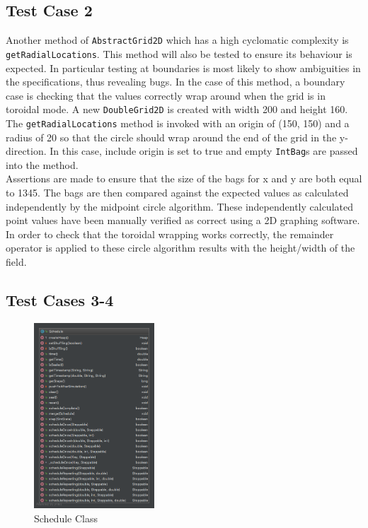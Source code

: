 \documentclass[11pt]{article}
\begin{document}
\subsection{Test Case 2}
Another method of \texttt{AbstractGrid2D} which has a high cyclomatic complexity is \texttt{getRadialLocations}.
This method will also be tested to ensure its behaviour is expected.
In particular testing at boundaries is most likely to show ambiguities in the specifications\cite[pp.25]{lessons_book}, thus revealing bugs.
In the case of this method, a boundary case is checking that the values correctly wrap around when the grid is in toroidal mode.
A new \texttt{DoubleGrid2D} is created with width 200 and height 160.
The \texttt{getRadialLocations} method is invoked with an origin of (150, 150) and a radius of 20 so that the circle should wrap around the end of the grid in the y-direction.
In this case, include origin is set to true and empty \texttt{IntBag}s are passed into the method.
\\

Assertions are made to ensure that the size of the bags for x and y are both equal to 1345.
The bags are then compared against the expected values as calculated independently by the midpoint circle algorithm.
These independently calculated point values have been manually verified as correct using a 2D graphing software.
In order to check that the toroidal wrapping works correctly, the remainder operator is applied to these circle algorithm results with the height/width of the field.

\subsection{Test Cases 3-4}
\begin{figure} 
	\vspace{-25pt}
	\begin{center}
		\includegraphics[width=0.4\textwidth]{Appendix/Schedule}
		\caption{Schedule Class}
		\label{fig:schedule}
	\end{center}
\end{figure}
\end{document}
